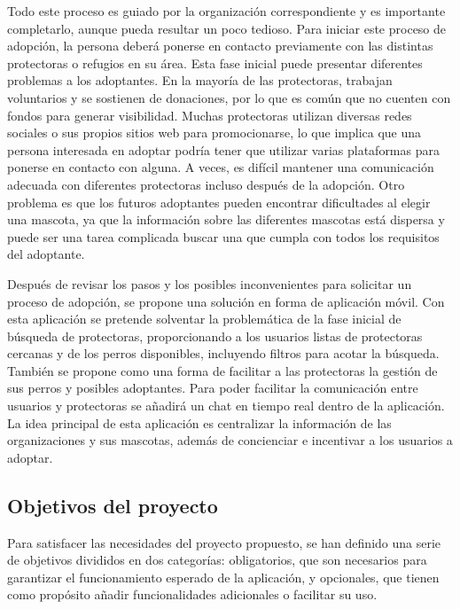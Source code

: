 \documentclass[a4paper, 12pt]{article}
\begin{document}
Todo este proceso es guiado por la organización correspondiente y es importante completarlo, aunque pueda resultar un poco tedioso. Para iniciar este proceso de adopción, la persona deberá ponerse en contacto previamente con las distintas protectoras o refugios en su área. Esta fase inicial puede presentar diferentes problemas a los adoptantes. En la mayoría de las protectoras, trabajan voluntarios y se sostienen de donaciones, por lo que es común que no cuenten con fondos para generar visibilidad. Muchas protectoras utilizan diversas redes sociales o sus propios sitios web para promocionarse, lo que implica que una persona interesada en adoptar podría tener que utilizar varias plataformas para ponerse en contacto con alguna. A veces, es difícil mantener una comunicación adecuada con diferentes protectoras incluso después de la adopción. Otro problema es que los futuros adoptantes pueden encontrar dificultades al elegir una mascota, ya que la información sobre las diferentes mascotas está dispersa y puede ser una tarea complicada buscar una que cumpla con todos los requisitos del adoptante.

Después de revisar los pasos y los posibles inconvenientes para solicitar un proceso de adopción, se propone una solución en forma de aplicación móvil. Con esta aplicación se pretende solventar la problemática de la fase inicial de búsqueda de protectoras, proporcionando a los usuarios listas de protectoras cercanas y de los perros disponibles, incluyendo filtros para acotar la búsqueda. También se propone como una forma de facilitar a las protectoras la gestión de sus perros y posibles adoptantes. Para poder facilitar la comunicación entre usuarios y protectoras se añadirá un chat en tiempo real dentro de la aplicación. La idea principal de esta aplicación es centralizar la información de las organizaciones y sus mascotas, además de concienciar e incentivar a los usuarios a adoptar.


\newpage
\subsection{Objetivos del proyecto}

Para satisfacer las necesidades del proyecto propuesto, se han definido una serie de objetivos divididos en dos categorías: obligatorios, que son necesarios para garantizar el funcionamiento esperado de la aplicación, y opcionales, que tienen como propósito añadir funcionalidades adicionales o facilitar su uso.
\end{document}

